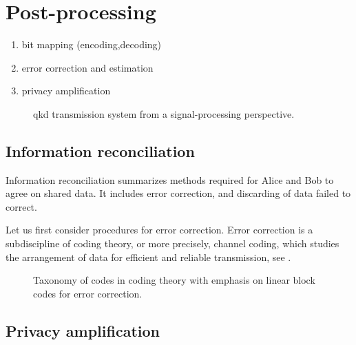\section{Post-processing}

\begin{enumerate}
	\item bit mapping (encoding,decoding)
	\item error correction and estimation
	\item privacy amplification
\end{enumerate}




\begin{figure}[htb]
	\centering
	
	\caption{\Gls{qkd} transmission system from a signal-processing perspective.}
\end{figure}

\cite{Silberhorn2002} %
\cite{Fung2010} %

\cite{Leverrier2008} %
\cite{Elkouss2011} %

\subsection{Information reconciliation}

Information reconciliation summarizes methods required for Alice and Bob to agree on shared data.
It includes error correction, and discarding of data failed to correct.

Let us first consider procedures for error correction.
Error correction is a subdiscipline of coding theory, or more precisely, channel coding, which studies the arrangement of data for efficient and reliable transmission, see .
\begin{figure}[htb]
	\centering
	
	\caption{Taxonomy of codes in coding theory with emphasis on linear block codes for error correction.}\label{fig:error_correction_codes}
\end{figure}

\subsection{Privacy amplification}


\cite{Bennett1995} %